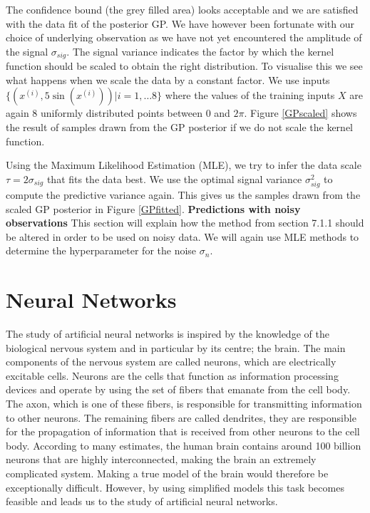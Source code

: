 \documentclass[english]{article}
\begin{document}
The confidence bound (the grey filled area) looks acceptable and we are satisfied with the data fit of the posterior GP. We have however been fortunate with our choice of underlying observation as we have not yet encountered the amplitude of the signal $\sigma_{sig}$. The signal variance indicates the factor by which the kernel function should be scaled to obtain the right distribution. To visualise this we see what happens when we scale the data by a constant factor. We use inputs $\{(x^{(i)},5\sin(x^{(i)}))|i=1,\ldots 8\}$ where the values of the training inputs $X$ are again 8 uniformly distributed points between $0$ and $2\pi$. Figure \ref{GPscaled} shows the result of samples drawn from the GP posterior if we do not scale the kernel function. 

\noindent Using the Maximum Likelihood Estimation (MLE), we try to infer the data scale $\tau = 2\sigma_{sig}$ that fits the data best. We use the optimal signal variance $\sigma_{sig}^2$ to compute the predictive variance again. This gives us the samples drawn from the scaled GP posterior in Figure \ref{GPfitted}.
\newline\newline
\textbf{Predictions with noisy observations}
\newline
This section will explain how the method from section 7.1.1 should be altered in order to be used on noisy data. We will again use MLE methods to determine the hyperparameter for the noise $\sigma_{n}$.
\newpage
\section{Neural Networks}
The study of artificial neural networks is inspired by the knowledge of the biological nervous system and in particular by its centre; the brain. The main components of the nervous system are called neurons, which are electrically excitable cells. Neurons are the cells that function as information processing devices and operate by using the set of fibers that emanate from the cell body. The axon, which is one of these fibers, is responsible for transmitting information to other neurons. The remaining fibers are called dendrites, they are responsible for the propagation of information that is received from other neurons to the cell body. According to many estimates, the human brain contains around 100 billion neurons that are highly interconnected, making the brain an extremely complicated system. Making a true model of the brain would therefore be exceptionally difficult. However, by using simplified models this task becomes feasible and leads us to the study of artificial neural networks.
\end{document}
